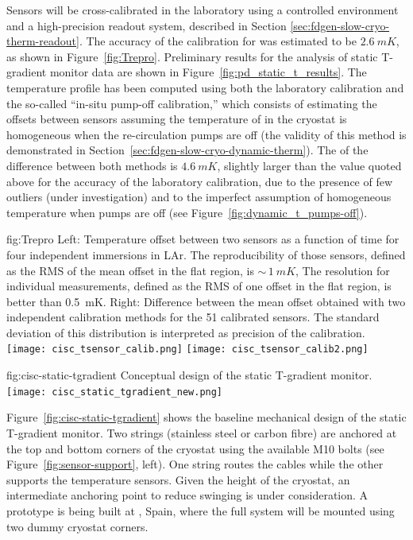 Sensors will be cross-calibrated in the laboratory using a controlled environment and a high-precision readout system, described in Section \ref{sec:fdgen-slow-cryo-therm-readout}.
The accuracy of the calibration for  was estimated to be $\SI{2.6}{mK}$, as shown in Figure~\ref{fig:Trepro}. Preliminary results for the analysis of  static T-gradient monitor data are shown in Figure~\ref{fig:pd_static_t_results}. The temperature profile has been computed using both the laboratory calibration and the so-called ``in-situ pump-off calibration,'' which consists %
of estimating the offsets between sensors assuming the temperature of  in the cryostat is homogeneous when the re-circulation pumps are off (the validity of this method is demonstrated in Section~\ref{sec:fdgen-slow-cryo-dynamic-therm}).  
The  of the difference between both methods is $\SI{4.6}{mK}$, slightly larger than the value quoted above for the accuracy of the laboratory calibration, due to the presence of few outliers (under investigation) and to the imperfect assumption of homogeneous temperature when pumps are off (see Figure~\ref{fig:dynamic_t_pumps-off}).  


\begin{dunefigure}{fig:Trepro}{
 Left:   Temperature offset between two sensors as a function of time for four independent immersions in LAr. The reproducibility of those sensors, defined as the RMS of the mean offset in the flat region, is $\sim\,\SI{1}{mK}$,
    The resolution for individual measurements, defined as the RMS of one offset in the flat region, is better than \SI{0.5}{mK}. Right: Difference between the mean offset obtained with two independent calibration methods for the 51 calibrated sensors. The standard deviation of this distribution is interpreted as precision of the calibration.}
  \texttt{[image: cisc\_tsensor\_calib.png]}%
  \texttt{[image: cisc\_tsensor\_calib2.png]}%
\end{dunefigure}


\begin{dunefigure}
{fig:cisc-static-tgradient}
  {Conceptual design of the static T-gradient monitor.}
  \texttt{[image: cisc\_static\_tgradient\_new.png]}
\end{dunefigure}

Figure~\ref{fig:cisc-static-tgradient} shows the baseline mechanical design of
the static T-gradient monitor. Two strings (stainless steel or carbon fibre) are anchored at the top and bottom corners of the cryostat using the available M10 bolts (see Figure~\ref{fig:sensor-support}, left). One string routes the cables while the other supports the temperature sensors.
Given the height of the cryostat, an intermediate anchoring point to reduce swinging is under consideration. 
A prototype is being built at , Spain, where the full system will be mounted using two dummy cryostat corners.   


